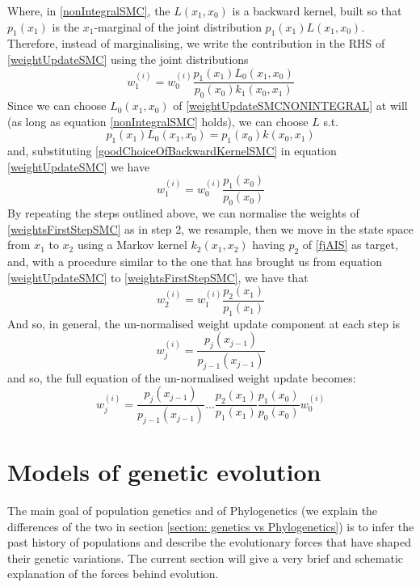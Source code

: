 \documentclass[12pt,mythesisstyle]{report}
\begin{document}
Where, in \eqref{nonIntegralSMC}, the $L(x_1,x_0)$ is a backward kernel, built so that $p_1(x_1)$ is the $x_1$-marginal of the joint distribution $p_1(x_1)L(x_1,x_0)$. Therefore, instead of marginalising, we write the contribution in the RHS of \eqref{weightUpdateSMC} using the joint distributions
\begin{equation}\label{weightUpdateSMCNONINTEGRAL}
w^{(i)}_1=w^{(i)}_0\frac{p_1(x_1)L_0(x_1,x_0)}{p_0(x_0)k_1(x_0,x_1)}
\end{equation}
Since we can choose $L_0(x_1,x_0)$ of \eqref{weightUpdateSMCNONINTEGRAL} at will (as long as equation \eqref{nonIntegralSMC} holds), we can choose $L$ s.t.
\begin{equation}\label{goodChoiceOfBackwardKernelSMC}
p_1(x_1)L_0(x_1,x_0)=p_1(x_0)k(x_0,x_1)
\end{equation}
and, substituting \eqref{goodChoiceOfBackwardKernelSMC} in equation \eqref{weightUpdateSMC} we have
\begin{equation}\label{weightsFirstStepSMC}
w^{(i)}_1=w^{(i)}_0\frac{p_1(x_0)}{p_0(x_0)}
\end{equation}
By repeating the steps outlined above, we can normalise the weights of \eqref{weightsFirstStepSMC} as in step 2, we resample, then we move in the state space from $x_1$ to $x_2$ using a Markov kernel $k_2(x_1,x_2)$ having $p_2$ of \eqref{fjAIS} as target, and, with a procedure similar to the one that has brought us from equation \eqref{weightUpdateSMC} to \eqref{weightsFirstStepSMC}, we have that
\begin{equation}\label{weightsSecondStepSMC}
w^{(i)}_2=w^{(i)}_1\frac{p_2(x_1)}{p_1(x_1)}
\end{equation}
And so, in general, the un-normalised weight update component at each step is
\begin{equation}\label{smcPartialWeightUpdate}
	w^{(i)}_j=\frac{p_j(x_{j-1})}{p_{j-1}(x_{j-1})}
\end{equation}
and so, the full equation of the un-normalised weight update becomes:
\begin{equation}\label{smcPartialWeightUpdate}
	w^{(i)}_j=\frac{p_j(x_{j-1})}{p_{j-1}(x_{j-1})}...\frac{p_2(x_{1})}{p_{1}(x_{1})}\frac{p_1(x_{0})}{p_{0}(x_{0})}w^{(i)}_0
\end{equation}


\section{Models of genetic evolution}\label{section: models of genetic evolution}
The main goal of population genetics and of Phylogenetics (we explain the differences of the two in section \ref{section: genetics vs Phylogenetics}) is to infer the past history of populations and describe the evolutionary forces that have shaped their genetic variations. The current section will give a very brief and schematic explanation of the forces behind evolution.
\end{document}
